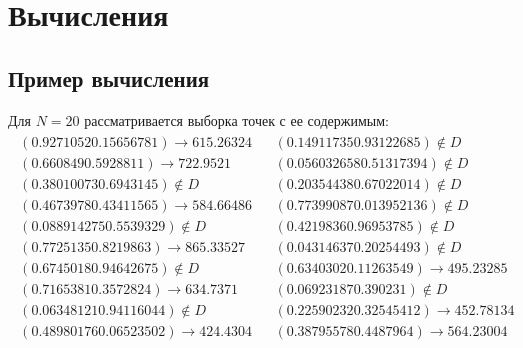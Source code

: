 \section{Вычисления}
\subsection{Пример вычисления}
Для \(N = 20\) рассматривается выборка точек с ее содержимым:
\begin{align*}
	\begin{array}{lcl}
		(0.9271052 0.15656781)   \to 615.26324 &  & (0.14911735 0.93122685)   \not\in D     \\
		(0.660849 0.5928811)     \to 722.9521  &  & (0.056032658 0.51317394)  \not\in D     \\
		(0.38010073 0.6943145)   \not\in D     &  & (0.20354438 0.67022014)   \not\in D     \\
		(0.4673978 0.43411565)   \to 584.66486 &  & (0.77399087 0.013952136)  \not\in D     \\
		(0.088914275 0.5539329)  \not\in D     &  & (0.4219836 0.96953785)    \not\in D     \\
		(0.7725135 0.8219863)    \to 865.33527 &  & (0.04314637 0.20254493)   \not\in D     \\
		(0.6745018 0.94642675)   \not\in D     &  & (0.6340302 0.11263549)    \to 495.23285 \\
		(0.7165381 0.3572824)    \to 634.7371  &  & (0.06923187 0.390231)     \not\in D     \\
		(0.06348121 0.94116044)  \not\in D     &  & (0.22590232 0.32545412)   \to 452.78134 \\
		(0.48980176 0.06523502)  \to 424.4304  &  & (0.38795578 0.4487964)    \to 564.23004 \\
	\end{array}
\end{align*}
